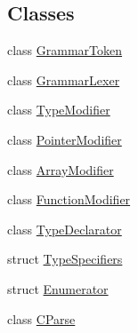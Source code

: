 \subsection*{Classes}
\begin{DoxyCompactItemize}
\item 
class \mbox{\hyperlink{class_grammar_token}{Grammar\+Token}}
\item 
class \mbox{\hyperlink{class_grammar_lexer}{Grammar\+Lexer}}
\item 
class \mbox{\hyperlink{class_type_modifier}{Type\+Modifier}}
\item 
class \mbox{\hyperlink{class_pointer_modifier}{Pointer\+Modifier}}
\item 
class \mbox{\hyperlink{class_array_modifier}{Array\+Modifier}}
\item 
class \mbox{\hyperlink{class_function_modifier}{Function\+Modifier}}
\item 
class \mbox{\hyperlink{class_type_declarator}{Type\+Declarator}}
\item 
struct \mbox{\hyperlink{struct_type_specifiers}{Type\+Specifiers}}
\item 
struct \mbox{\hyperlink{struct_enumerator}{Enumerator}}
\item 
class \mbox{\hyperlink{class_c_parse}{C\+Parse}}
\end{DoxyCompactItemize}
